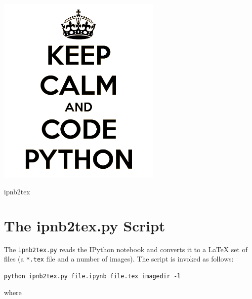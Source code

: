 \documentclass[english]{workpackage}[1996/06/02]
\begin{document}
\WPlayout
\ 
\vspace{50mm}
\begin{center}
\includegraphics[width=0.6\textwidth]{./images/keep-calm-and-code-python_BW.png}
\end{center}
\vspace{5mm}
\begin{center}
{\LARGE  ipnb2tex}
\end{center}

\newpage

\tableofcontents
\listoffigures
\listoftables
\lstlistoflistings

\chapter{The ipnb2tex.py Script}
\label{sec:Theipnb2texpyScript}

The \verb+ipnb2tex.py+ reads the IPython notebook and converts it to a \LaTeX{} set of files (a \verb+*.tex+ file and a number of images).  The script is invoked as follows:


\verb+python ipnb2tex.py file.ipynb file.tex imagedir -l+


where
\end{document}
